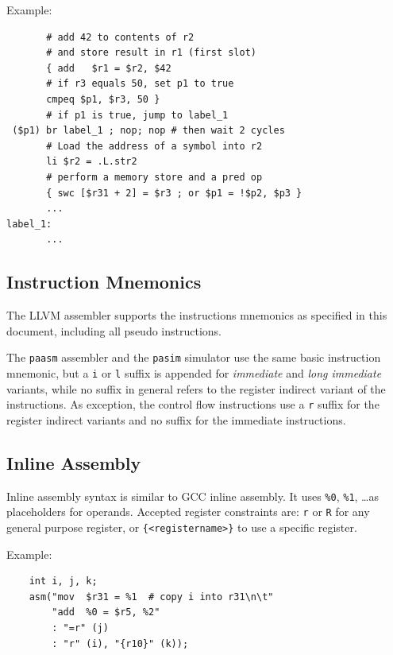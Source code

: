 \documentclass[a4paper,fontsize=10pt,twoside,DIV15,BCOR12mm,headinclude=true,footinclude=false,pagesize,bibtotoc]{scrbook}
\newcommand{\comment}[3]{

\textsf{\textbf{#1}} {\color{#3}#2}}
\newcommand{\stefan}[1]{\comment{Stefan}{#1}{RoyalPurple}}
\renewcommand{\stefan}[1]{}
\begin{document}
Example:
\begin{verbatim}
       # add 42 to contents of r2
       # and store result in r1 (first slot)
       { add   $r1 = $r2, $42
       # if r3 equals 50, set p1 to true
       cmpeq $p1, $r3, 50 }
       # if p1 is true, jump to label_1
 ($p1) br label_1 ; nop; nop # then wait 2 cycles
       # Load the address of a symbol into r2
       li $r2 = .L.str2
       # perform a memory store and a pred op
       { swc [$r31 + 2] = $r3 ; or $p1 = !$p2, $p3 }
       ...
label_1:
       ...
\end{verbatim}

\stefan{TODO: some words about units of .align, .size, ..; describe .fstart;
I would like to move the assembly format description out into a public repo (patmos-misc) and merge
it with a compiler usage manual, ELF file format and backend description, though.}

\subsection{Instruction Mnemonics}

The LLVM assembler supports the instructions mnemonics as specified in this document, including all pseudo instructions.

The \texttt{paasm} assembler and the \texttt{pasim} simulator use the same basic instruction mnemonic, but a \texttt{i} or
\texttt{l} suffix is appended for \emph{immediate} and \emph{long immediate} variants, while no suffix in general refers to
the register indirect variant of the instructions. As exception, the control flow instructions use a \texttt{r} suffix for the register
indirect variants and no suffix for the immediate instructions.
\stefan{This should be cleaned up, always use \texttt{i} suffix for immediates in pasim/paasm, including control flow.}

\subsection{Inline Assembly}

Inline assembly syntax is similar to GCC inline assembly. It uses \texttt{\%0}, \texttt{\%1}, \ldots as placeholders
for operands. Accepted register constraints are: \texttt{r} or \texttt{R} for any general purpose register, or
\texttt{\{<registername>\}} to use a specific register.

Example:
\begin{lstlisting}
    int i, j, k;
    asm("mov  $r31 = %1  # copy i into r31\n\t"
        "add  %0 = $r5, %2"
        : "=r" (j)
        : "r" (i), "{r10}" (k));
\end{lstlisting}
\end{document}
